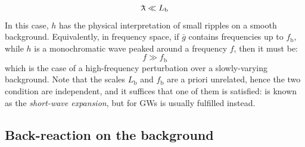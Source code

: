 
\begin{equation}
  \lbar \ll L_\text{b}
  \label{eq:l-condition}
\end{equation}
In this case, $ h $ has the physical interpretation of small ripples on a smooth background. Equivalently, in frequency space, if $ \bar{g} $ contains frequencies up to $ f_\text{b} $, while $ h $ is a monochromatic wave peaked around a frequency $ f $, then it must be:
\begin{equation}
  f \gg f_\text{b}
  \label{eq:f-condition}
\end{equation}
which is the case of a high-frequency perturbation over a slowly-varying background. Note that the scales $ L_\text{b} $ and $ f_\text{b} $ are a priori unrelated, hence the two condition are independent, and it suffices that one of them is satisfied:  is known as the \emph{short-wave expansion}, but for GWs  is usually fulfilled instead\footnotemark.

\subsection{Back-reaction on the background}


